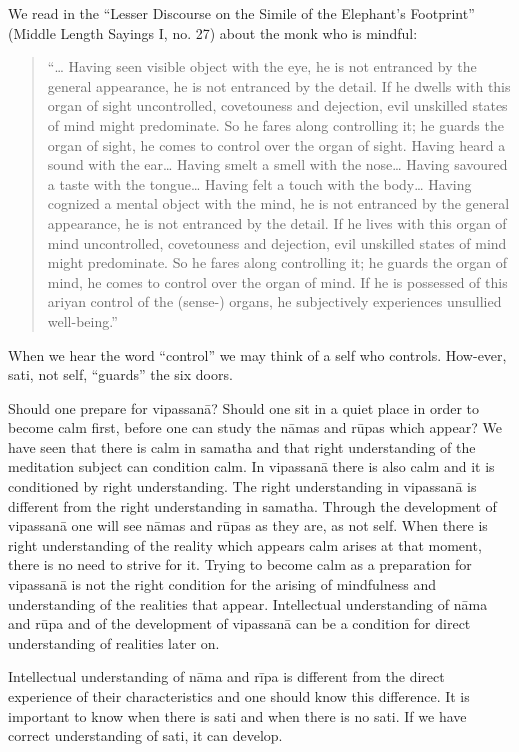 We read in the ``Lesser Discourse on the Simile of the Elephant's
Footprint'' (Middle Length Sayings I, no. 27) about the monk who is
mindful:

\begin{quote}
``\ldots{} Having seen visible object with the eye, he is not entranced
by the general appearance, he is not entranced by the detail. If he
dwells with this organ of sight uncontrolled, covetouness and dejection,
evil unskilled states of mind might predominate. So he fares along
controlling it; he guards the organ of sight, he comes to control over
the organ of sight. Having heard a sound with the ear\ldots{} Having
smelt a smell with the nose\ldots{} Having savoured a taste with the
tongue\ldots{} Having felt a touch with the body\ldots{} Having cognized
a mental object with the mind, he is not entranced by the general
appearance, he is not entranced by the detail. If he lives with this
organ of mind uncontrolled, covetouness and dejection, evil unskilled
states of mind might predominate. So he fares along controlling it; he
guards the organ of mind, he comes to control over the organ of mind. If
he is possessed of this ariyan control of the (sense-) organs, he
subjectively experiences unsullied well-being.''
\end{quote}

When we hear the word ``control'' we may think of a self who controls.
How-ever, sati, not self, ``guards'' the six doors.

Should one prepare for vipassanā? Should one sit in a quiet place in
order to become calm first, before one can study the nāmas and rūpas
which appear? We have seen that there is calm in samatha and that right
understanding of the meditation subject can condition calm. In vipassanā
there is also calm and it is conditioned by right understanding. The
right understanding in vipassanā is different from the right
understanding in samatha. Through the development of vipassanā one will
see nāmas and rūpas as they are, as not self. When there is right
understanding of the reality which appears calm arises at that moment,
there is no need to strive for it. Trying to become calm as a
preparation for vipassanā is not the right condition for the arising of
mindfulness and understanding of the realities that appear. Intellectual
understanding of nāma and rūpa and of the development of vipassanā can
be a condition for direct understanding of realities later on.

Intellectual understanding of nāma and rīpa is different from the direct
experience of their characteristics and one should know this difference.
It is important to know when there is sati and when there is no sati. If
we have correct understanding of sati, it can develop.

